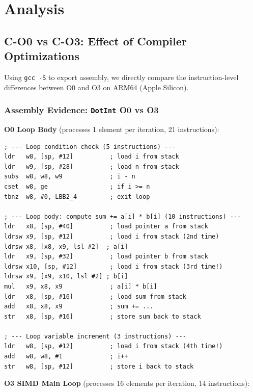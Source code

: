 \documentclass[12pt,a4paper]{article}
\begin{document}
\section{Analysis}

\subsection{C-O0 vs C-O3: Effect of Compiler Optimizations}

Using \texttt{gcc -S} to export assembly, we directly compare the instruction-level differences between O0 and O3 on ARM64 (Apple Silicon).

\subsubsection{Assembly Evidence: \texttt{DotInt} O0 vs O3}

\textbf{O0 Loop Body} (processes 1 element per iteration, 21 instructions):

\begin{lstlisting}
; --- Loop condition check (5 instructions) ---
ldr   w8, [sp, #12]          ; load i from stack
ldr   w9, [sp, #28]          ; load n from stack
subs  w8, w8, w9             ; i - n
cset  w8, ge                 ; if i >= n
tbnz  w8, #0, LBB2_4         ; exit loop

; --- Loop body: compute sum += a[i] * b[i] (10 instructions) ---
ldr   x8, [sp, #40]          ; load pointer a from stack
ldrsw x9, [sp, #12]          ; load i from stack (2nd time)
ldrsw x8, [x8, x9, lsl #2]  ; a[i]
ldr   x9, [sp, #32]          ; load pointer b from stack
ldrsw x10, [sp, #12]         ; load i from stack (3rd time!)
ldrsw x9, [x9, x10, lsl #2] ; b[i]
mul   x9, x8, x9             ; a[i] * b[i]
ldr   x8, [sp, #16]          ; load sum from stack
add   x8, x8, x9             ; sum += ...
str   x8, [sp, #16]          ; store sum back to stack

; --- Loop variable increment (3 instructions) ---
ldr   w8, [sp, #12]          ; load i from stack (4th time!)
add   w8, w8, #1             ; i++
str   w8, [sp, #12]          ; store i back to stack
\end{lstlisting}

\textbf{O3 SIMD Main Loop} (processes 16 elements per iteration, 14 instructions):
\end{document}
